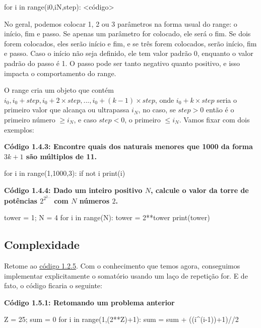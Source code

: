 \documentclass[11pt, a4paper]{article}
\begin{document}
\begin{code}
for i in range(i0,iN,step):
    <código>
\end{code}

No geral, podemos colocar 1, 2 ou 3 parâmetros na forma usual do range: o início, fim e passo. Se apenas um parâmetro for colocado, ele será o fim. Se dois forem colocados, eles serão início e fim, e se três forem colocados, serão início, fim e passo. Caso o início não seja definido, ele tem valor padrão 0, enquanto o valor padrão do passo é 1. O passo pode ser tanto negativo quanto positivo, e isso impacta o comportamento do range.

O range cria um objeto que contém \(i_0,i_0+step,i_0+2\times step,...,i_0+(k-1)\times step\), onde \(i_0+k\times step\) seria o primeiro valor que alcança ou ultrapassa \(i_N\), no caso, se \(step>0\) então é o primeiro número \(\geq i_N\), e caso \(step < 0\), o primeiro \(\leq i_N\). Vamos fixar com dois exemplos:

\textbf{Código 1.4.3: Encontre quais dos naturais menores que 1000 da forma \(3k+1\) são múltiplos de 11.}

\begin{code}
for i in range(1,1000,3):
    if not i%
        print(i)
\end{code}

\textbf{Código 1.4.4: Dado um inteiro positivo \(N\), calcule o valor da torre de potências \(2^{2^{2...}}\) com \(N\) números \(2\).}

\begin{code}
tower = 1; N = 4
for i in range(N):
    tower = 2**tower
print(tower)
\end{code}

\subsection{Complexidade}

Retome ao \hyperref[c1.2.5]{código 1.2.5}. Com o conhecimento que temos agora, conseguimos implementar explicitamente o somatório usando um laço de repetição for. E de fato, o código ficaria o seguinte:

\label{c1.5.1}

\textbf{Código 1.5.1: Retomando um problema anterior}

\begin{code}
Z = 25; sum = 0
for i in range(1,(2**Z)+1):
    sum = sum + ((i^(i-1))+1)//2
\end{code}
\end{document}
